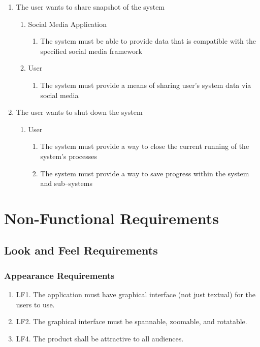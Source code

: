 \documentclass[]{article}
\begin{document}
\begin{enumerate}
\begin{enumerate}
	\end{enumerate}
	\item The user wants to share snapshot of the system
	\begin{enumerate}
		\item Social Media Application
			\begin{enumerate}
				\item The system must be able to provide data that is compatible with the specified social media framework
			\end{enumerate}
			\item User
			\begin{enumerate}
				\item The system must provide a means of sharing user’s system data via social media
			\end{enumerate}
	\end{enumerate}
	\item The user wants to shut down the system
	\begin{enumerate}
		\item User
			\begin{enumerate}
				\item The system must provide a way to close the current running of the system’s processes
				\item The system must provide a way to save progress within the system and sub--systems
			\end{enumerate}
	\end{enumerate}
\end{enumerate}

\section{Non-Functional Requirements}
\subsection{Look and Feel Requirements}
\subsubsection{Appearance Requirements}
\begin{enumerate}
\item LF1. The application must have graphical interface (not just textual) for the users to use.
\item LF2. The graphical interface must be spannable, zoomable, and rotatable.
\item LF4. The product shall be attractive to all audiences. 
\end{enumerate}
\end{document}
